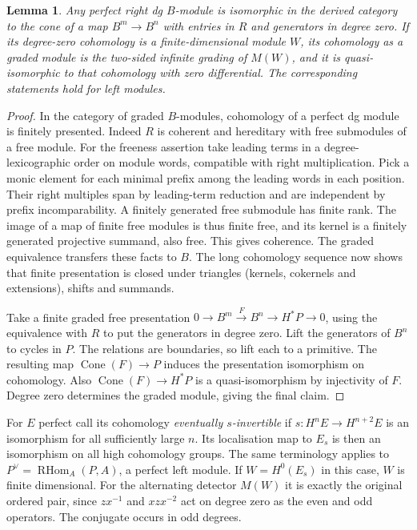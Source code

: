 \documentclass[11pt]{article}
\newtheorem{lemma}[theorem]{Lemma}
\newcommand{\HHom}{\operatorname{RHom}}
\newcommand{\cone}{\operatorname{Cone}}
\begin{document}
\begin{lemma}\label{presentation}
Any perfect right dg $B$-module is isomorphic in the derived category to
the cone of a map $B^m\to B^n$ with entries in $R$ and generators in
degree zero. If its degree-zero cohomology is a finite-dimensional module
$W$, its cohomology as a graded module is the two-sided infinite grading
of $M(W)$, and it is quasi-isomorphic to that cohomology with zero
differential. The corresponding statements hold for left modules.
\end{lemma}
\begin{proof}
In the category of graded $B$-modules, cohomology of a perfect dg module
is finitely presented. Indeed $R$ is coherent and hereditary with free
submodules of a free module. For the freeness assertion take leading
terms in a degree-lexicographic order on module words, compatible with
right multiplication. Pick a monic element for each minimal prefix among
the leading words in each position. Their right multiples span by
leading-term reduction and are independent by prefix incomparability.
A finitely generated free submodule has finite rank. The image of a
map of finite free modules is thus finite free, and its kernel is a
finitely generated projective summand, also free. This gives coherence.
The graded equivalence transfers these facts to $B$.
The long cohomology sequence now shows that finite presentation is closed
under triangles (kernels, cokernels and extensions), shifts and summands.

Take a finite graded free presentation $0\to B^m\xrightarrow{F} B^n
\to H^*P\to0$, using the equivalence with $R$ to put the generators
in degree zero. Lift the generators of $B^n$ to cycles in $P$.
The relations are boundaries, so lift each to a primitive. The resulting
map $\cone(F)\to P$ induces the presentation isomorphism on cohomology.
Also $\cone(F)\to H^*P$ is a quasi-isomorphism by injectivity of $F$.
Degree zero determines the graded module, giving the final claim.
\end{proof}

For $E$ perfect call its cohomology \emph{eventually $s$-invertible}
if $s:H^nE\to H^{n+2}E$ is an isomorphism for all sufficiently large
$n$. Its localisation map to $E_s$ is then an isomorphism on all high
cohomology groups. The same terminology applies to $P^\vee=\HHom_A(P,A)$,
a perfect left module. If $W=H^0(E_s)$ in this case, $W$ is finite
dimensional. For the alternating detector $M(W)$ it is exactly the
original ordered pair, since $zx^{-1}$ and $xzx^{-2}$ act on degree zero
as the even and odd operators. The conjugate occurs in odd degrees.
\end{document}
